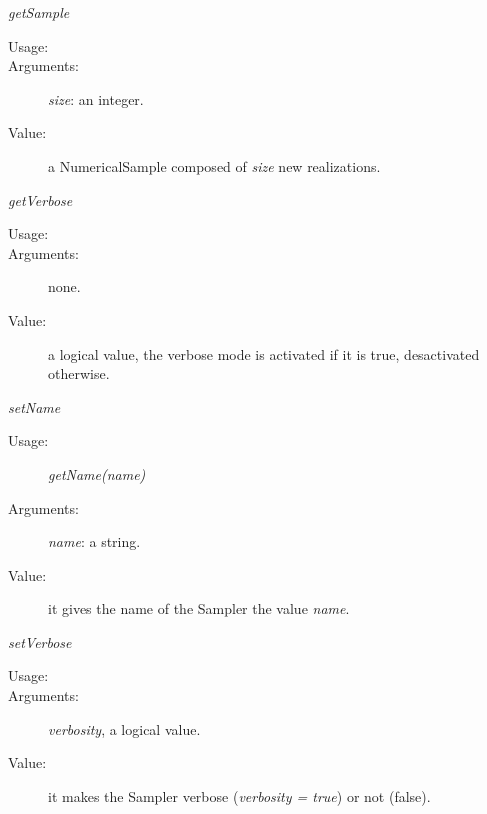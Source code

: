 \begin{description}
\begin{description}
\item \textit{getSample}
\begin{description}
\item[Usage:] \rule{0pt}{1em}
\item[Arguments:] \textit{size}: an integer. \rule{0pt}{1em}
\item[Value:] a NumericalSample composed of \textit{size} new realizations.
\end{description}
\bigskip

\item \textit{getVerbose}
\begin{description}
\item[Usage:] \rule{0pt}{1em}
\item[Arguments:] none. \rule{0pt}{1em}
\item[Value:] a logical value, the verbose mode is activated if it is true,
desactivated otherwise.
\end{description}
\bigskip

\item \textit{setName}
\begin{description}
\item[Usage:] \textit{getName(name)}
\item[Arguments:] \textit{name}: a string.
\item[Value:] it gives the name of the Sampler the value \textit{name}.
\end{description}
\bigskip

\item \textit{setVerbose}
\begin{description}
\item[Usage:] \rule{0pt}{1em}
\item[Arguments:] \textit{verbosity}, a logical value. \rule{0pt}{1em}
\item[Value:] it makes the Sampler verbose (\textit{verbosity = true}) or not
(false).
\end{description}

\end{description}

\end{description}

